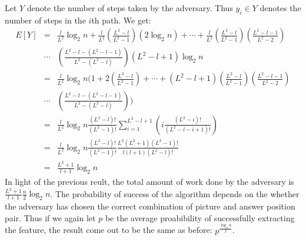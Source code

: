 \documentclass{llncs}
\begin{document}
Let $Y$ denote the number of steps taken by the adversary. Thus $y_i  \in Y$ denotes the number of steps in the $i$th path. We get:
\begin{eqnarray*}
E\left[ Y \right] &=& \frac{l}{{L^2 }}\log _2 n + \frac{l}{{L^2 }}\left( {\frac{{L^2  - l}}{{L^2  - 1}}} \right)\left( {2\log _2 n} \right) +  \cdots  + \frac{l}{{L^2 }}\left( {\frac{{L^2  - l}}{{L^2  - 1}}} \right)\left( {\frac{{L^2  - l - 1}}{{L^2  - 2}}} \right)\\
  &\cdots& \left( {\frac{{L^2  - l - \left( {L^2  - l - 1} \right)}}{{L^2  - \left( {L^2  - l} \right)}}} \right)\left( {L^2  - l + 1} \right)\log _2 n\\  
   &=& \frac{l}{{L^2 }}\log _2 n( 1 + 2\left( {\frac{{L^2  - l}}{{L^2  - 1}}} \right) +  \cdots  + \left( {L^2  - l + 1} \right)\left( {\frac{{L^2  - l}}{{L^2  - 1}}} \right)\left( {\frac{{L^2  - l - 1}}{{L^2  - 2}}} \right)\\
   &\cdots& \left( {\frac{{L^2  - l - \left( {L^2  - l - 1} \right)}}{{L^2  - \left( {L^2  - l} \right)}}} \right) ) \\ 
   &=& \frac{l}{{L^2 }}\log _2 n\frac{{\left( {L^2  - l} \right)!}}{{\left( {L^2  - 1} \right)!}}\sum\nolimits_{i = 1}^{L^2  - l + 1} {\left( {i\frac{{\left( {L^2  - i} \right)!}}{{\left( {L^2  - l - i + 1} \right)!}}} \right)} \\ 
   &=& \frac{l}{{L^2 }}\log _2 n\frac{{\left( {L^2  - l} \right)!}}{{\left( {L^2  - 1} \right)!}}\frac{{L^2 \left( {L^2  + 1} \right)\left( {L^2  - 1} \right)!}}{{l\left( {l + 1} \right)\left( {L^2  - l} \right)!}} \\
   &=& \frac{{L^2  + 1}}{{l + 1}}\log _2 n 
\end{eqnarray*}
In light of the previous reult, the total amount of work done by the adversary is $\frac{{L^2  + 1}}{{l + 1}}\frac{n}{2}\log _2 n$. The probability of success of the algorithm depends on the whether the adversary has chosen the correct combination of picture and answer position pair. Thus if we again let $p$ be the average proabibility of successfully extracting the feature, the result come out to be the same as before: $p^{\frac{{\log _2 n}}{2}} $.
\end{document}
